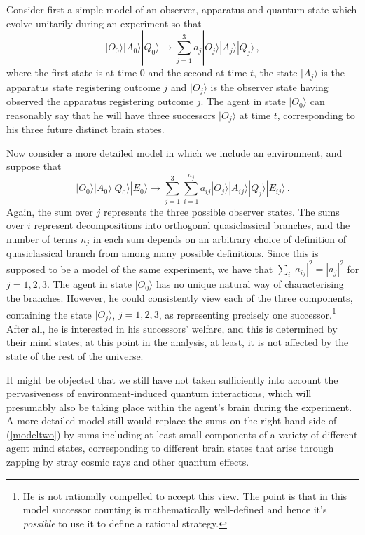 \documentclass[aps,
pra,epsfig,12pt,nofootinbib]{revtex4}
\def\ket#1{| #1\rangle}
\begin{document}
Consider first a simple model of 
an observer, apparatus and quantum state which evolve
unitarily during an experiment so that \begin{equation} \ket{O_0}\ket{A_0}\ket{Q_0} 
\rightarrow \sum_{j=1}^3 a_j \ket{O_j}\ket{A_j}\ket{Q_j}\, ,
\end{equation} where the first state is at time $0$ and the second at
time $t$, the state $\ket{A_j}$ is the apparatus state registering
outcome $j$ and $\ket{O_j}$ is the observer state having observed the
apparatus registering outcome $j$.  The agent in state $\ket{O_0}$ can
reasonably say that he will have three successors $\ket{O_j}$ at time
$t$, corresponding to his three future distinct brain states.

Now consider a more detailed model in which we include an environment,
and suppose that 
\begin{equation}\label{modeltwo} \ket{O_0}\ket{A_0}\ket{Q_0}\ket{E_0}
\rightarrow \sum_{j=1}^3 \sum_{i=1}^{n_j} 
a_{ij} \ket{O_j}\ket{A_{ij}}\ket{Q_{j}}\ket{E_{ij}}\, .
\end{equation} 
Again, the sum over $j$ represents the three possible
observer states.  The sums over $i$ represent
decompositions into orthogonal quasiclassical branches, and the number
of terms $n_j$ in each sum depends on an arbitrary choice 
of definition of quasiclassical branch from among many possible 
definitions.  Since this is supposed to be a model of
the same experiment, we have that $ \sum_i | a_{ij} |^2 = | a_j |^2 $
for $j = 1,2,3$.  The agent in state $\ket{O_0}$ has no unique natural
way of characterising the branches.  However, he could consistently view
each of the three components, containing the state $\ket{O_j}$, $j=1,2,3$,
as representing precisely one successor.\footnote{
He is not rationally compelled to accept this view. 
The point is that in this model successor counting is mathematically 
well-defined and hence it's {\it possible} to use it to define
a rational strategy.}  
After all, he is interested in his successors' welfare, and this is
determined by their mind states; at this point in
the analysis, at least, it is not affected by the state of the rest of the
universe.  

It might be objected that we still have not taken sufficiently into
account the pervasiveness of environment-induced quantum interactions,
which will presumably also be taking place within the agent's brain during the
experiment.  A more detailed model still would replace the sums on the
right hand side of (\ref{modeltwo}) by sums including at least small
components of a variety of different agent mind states, corresponding
to different brain states that arise through zapping by stray cosmic
rays and other quantum effects.
\end{document}
